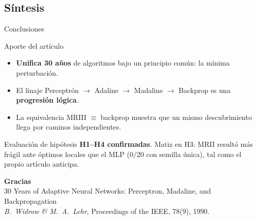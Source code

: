 \documentclass[aspectratio=169, 11pt, xcolor={dvipsnames,table}]{beamer}
\newcommand{\azul}[1]{\textcolor{UsachAzul}{#1}}
\begin{document}
\subsection{Síntesis}

\begin{frame}{Conclusiones}
\begin{block}{Aporte del artículo}
\begin{itemize}\footnotesize
  \item \textbf{Unifica 30 años} de algoritmos bajo un principio común: la \azul{mínima perturbación}.
  \item El linaje Perceptrón $\to$ Adaline $\to$ Madaline $\to$ Backprop es una \textbf{progresión lógica}.
  \item La equivalencia \azul{MRIII $\equiv$ backprop} muestra que un mismo descubrimiento llega por caminos independientes.
\end{itemize}
\end{block}
\begin{alertblock}{Evaluación de hipótesis}\footnotesize
\textbf{H1--H4 confirmadas}. Matiz en H3: MRII resultó más frágil ante óptimos locales que el MLP
($0/20$ con semilla única), tal como el propio artículo anticipa.
\end{alertblock}
\end{frame}

\begin{frame}[plain]
\vfill
\begin{center}
{\Huge\bfseries\azul{Gracias}}\\[10pt]
\footnotesize
30 Years of Adaptive Neural Networks: Perceptron, Madaline, and Backpropagation\\
\emph{B.\ Widrow \& M.\ A.\ Lehr}, Proceedings of the IEEE, 78(9), 1990.
\end{center}
\vfill
\end{frame}
\end{document}
